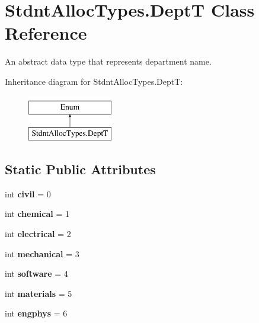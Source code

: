 \hypertarget{class_stdnt_alloc_types_1_1_dept_t}{}\section{Stdnt\+Alloc\+Types.\+DeptT Class Reference}
\label{class_stdnt_alloc_types_1_1_dept_t}


An abstract data type that represents department name.  


Inheritance diagram for Stdnt\+Alloc\+Types.\+DeptT\+:\begin{figure}[H]
\begin{center}
\leavevmode
\includegraphics[height=2.000000cm]{class_stdnt_alloc_types_1_1_dept_t}
\end{center}
\end{figure}
\subsection*{Static Public Attributes}
\begin{DoxyCompactItemize}
\item 
\mbox{\label{class_stdnt_alloc_types_1_1_dept_t_aada6de6cfa9e35835c94897913588edd}} 
int {\bfseries civil} = 0
\item 
\mbox{\label{class_stdnt_alloc_types_1_1_dept_t_a80264399591475d30e2b11edc8d3ed90}} 
int {\bfseries chemical} = 1
\item 
\mbox{\label{class_stdnt_alloc_types_1_1_dept_t_a05ec081635b490c6c2bd52b1a236d1db}} 
int {\bfseries electrical} = 2
\item 
\mbox{\label{class_stdnt_alloc_types_1_1_dept_t_a1aa44583eb22b8d664787fc5e82c5043}} 
int {\bfseries mechanical} = 3
\item 
\mbox{\label{class_stdnt_alloc_types_1_1_dept_t_a1b548d82705fc0b22d69d3628aaf4e4a}} 
int {\bfseries software} = 4
\item 
\mbox{\label{class_stdnt_alloc_types_1_1_dept_t_a89d19f797874a4f94621203c4a7b66e5}} 
int {\bfseries materials} = 5
\item 
\mbox{\label{class_stdnt_alloc_types_1_1_dept_t_af667a50955375f70988312c529ba7964}} 
int {\bfseries engphys} = 6
\end{DoxyCompactItemize}


